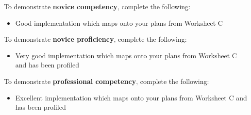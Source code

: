 \documentclass{../../../fal_assignment}
\begin{document}
To demonstrate \textbf{novice competency}, complete the following:
\begin{itemize}
	\item Good implementation which maps onto your plans from Worksheet C
\end{itemize}

To demonstrate \textbf{novice proficiency}, complete the following:
\begin{itemize}
	\item Very good implementation which maps onto your plans from Worksheet C and has been profiled
\end{itemize}

To demonstrate \textbf{professional competency}, complete the following:
\begin{itemize}
	\item Excellent implementation which maps onto your plans from Worksheet C and has been profiled
\end{itemize}
\end{document}
